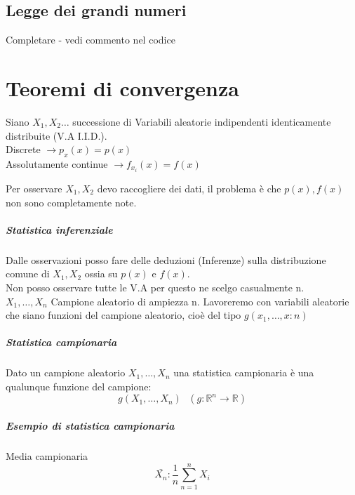 \documentclass[12pt, a4paper, openany]{book}
\begin{document}
\section{Legge dei grandi numeri}
Completare - vedi commento nel codice


\chapter{Teoremi di convergenza}
Siano $X_1, X_2 \dots $ successione di Variabili aleatorie indipendenti identicamente distribuite (V.A I.I.D.).
\\ Discrete $ \rightarrow p_x(x) = p(x) $
\\ Assolutamente continue $ \rightarrow f_{x_i} (x) = f(x) $

Per osservare $X_1, X_2$ devo raccogliere dei dati, il problema è che $p(x), f(x)$ non sono completamente
note. 
\paragraph*{Statistica inferenziale} Dalle osservazioni posso fare delle deduzioni (Inferenze) sulla distribuzione
comune di $X_1, X_2$ ossia su $p(x)$ e $f(x)$.
\\ Non posso osservare tutte le V.A per questo ne scelgo casualmente n. 
\\ $X_1, \dots ,X_n$ Campione aleatorio di ampiezza n. Lavoreremo con variabili aleatorie che siano funzioni del 
campione aleatorio, cioè del tipo $g(x_1, \dots ,x:n)$
\paragraph*{Statistica campionaria} Dato un campione aleatorio $X_1, \dots, X_n$ una statistica campionaria
è una qualunque funzione del campione:
\begin{equation*}
    g(X_1, \dots, X_n) \text{   } (g:\mathbb{R}^n\rightarrow\mathbb{R})
\end{equation*}

\paragraph*{Esempio di statistica campionaria} Media campionaria
\begin{equation*}
    \bar{X_n}:\frac{1}{n}\sum_{n=1}^n X_i
\end{equation*}
\end{document}
